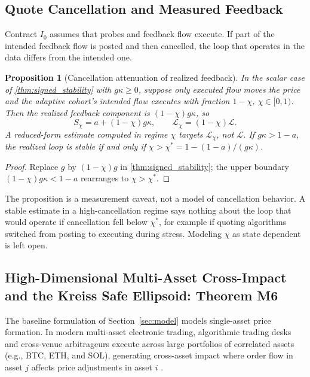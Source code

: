 \documentclass[10pt,twocolumn,letterpaper]{article}
\newtheorem{proposition}[theorem]{Proposition}
\theoremstyle{definition}
\theoremstyle{remark}
\begin{document}
\subsection{Quote Cancellation and Measured Feedback}
Contract $I_0$ assumes that probes and feedback flow execute. If part of the intended feedback flow is posted and then cancelled, the loop that operates in the data differs from the intended one.

\begin{proposition}[Cancellation attenuation of realized feedback]
\label{prop:cancellation_masking}
In the scalar case of \cref{thm:signed_stability} with $g\kappa\ge0$, suppose only executed flow moves the price and the adaptive cohort's intended flow executes with fraction $1-\chi$, $\chi\in[0,1)$. Then the realized feedback component is $(1-\chi)g\kappa$, so
\begin{equation}
    S_\chi=a+(1-\chi)g\kappa,\qquad \mathcal L_\chi=(1-\chi)\mathcal L .
\end{equation}
A reduced-form estimate computed in regime $\chi$ targets $\mathcal L_\chi$, not $\mathcal L$. If $g\kappa>1-a$, the realized loop is stable if and only if $\chi>\chi^*=1-(1-a)/(g\kappa)$.
\end{proposition}
\begin{proof}
Replace $g$ by $(1-\chi)g$ in \cref{thm:signed_stability}; the upper boundary $(1-\chi)g\kappa<1-a$ rearranges to $\chi>\chi^*$.
\end{proof}
The proposition is a measurement caveat, not a model of cancellation behavior. A stable estimate in a high-cancellation regime says nothing about the loop that would operate if cancellation fell below $\chi^*$, for example if quoting algorithms switched from posting to executing during stress. Modeling $\chi$ as state dependent is left open.

\subsection{High-Dimensional Multi-Asset Cross-Impact and the Kreiss Safe Ellipsoid: Theorem M6}
\label{sec:multi_asset_cross_impact}
The baseline formulation of Section~\ref{sec:model} models single-asset price formation. In modern multi-asset electronic trading, algorithmic trading desks and cross-venue arbitrageurs execute across large portfolios of correlated assets (e.g., BTC, ETH, and SOL), generating cross-asset impact where order flow in asset $j$ affects price adjustments in asset $i$ \citep{almgren2000,bouchaud2004fluctuations}.
\end{document}
